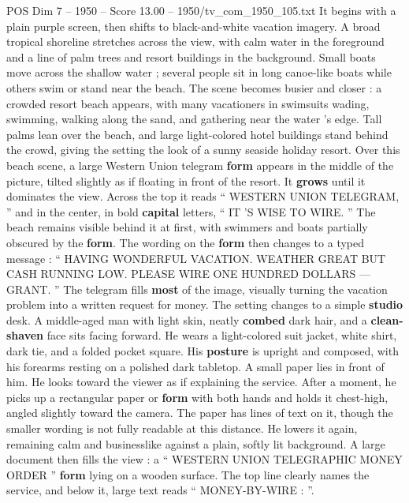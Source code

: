 \begin{textsample}{POS Dim 7 – 1950 – Score 13.00 – 1950/tv\_com\_1950\_105.txt}  \label{ex:f7_pos_018}
It begins with a plain purple screen, then shifts to black-and-white vacation imagery.
A broad tropical shoreline stretches across the view, with calm water in the foreground and a line of palm trees and resort buildings in the background.
Small boats move across the shallow water ; several people sit in long canoe-like boats while others swim or stand near the beach.
The scene becomes busier and closer : a crowded resort beach appears, with many vacationers in swimsuits wading, swimming, walking along the sand, and gathering near the water ’s edge.
Tall palms lean over the beach, and large light-colored hotel buildings stand behind the crowd, giving the setting the look of a sunny seaside holiday resort.
Over this beach scene, a large Western Union telegram \textbf{form} appears in the middle of the picture, tilted slightly as if floating in front of the resort.
It \textbf{grows} until it dominates the view.
Across the top it reads “ WESTERN UNION TELEGRAM, ” and in the center, in bold \textbf{capital} letters, “ IT ’S WISE TO WIRE. ” The beach remains visible behind it at first, with swimmers and boats partially obscured by the \textbf{form}.
The wording on the \textbf{form} then changes to a typed message : “ HAVING WONDERFUL VACATION.
WEATHER GREAT BUT CASH RUNNING LOW.
PLEASE WIRE ONE HUNDRED DOLLARS — GRANT. ” The telegram fills \textbf{most} of the image, visually turning the vacation problem into a written request for money.
The setting changes to a simple \textbf{studio} desk.
A middle-aged man with light skin, neatly \textbf{combed} dark hair, and a \textbf{clean-shaven} face sits facing forward.
He wears a light-colored suit jacket, white shirt, dark tie, and a folded pocket square.
His \textbf{posture} is upright and composed, with his forearms resting on a polished dark tabletop.
A small paper lies in front of him.
He looks toward the viewer as if explaining the service.
After a moment, he picks up a rectangular paper or \textbf{form} with both hands and holds it chest-high, angled slightly toward the camera.
The paper has lines of text on it, though the smaller wording is not fully readable at this distance.
He lowers it again, remaining calm and businesslike against a plain, softly lit background.
A large document then fills the view : a “ WESTERN UNION TELEGRAPHIC MONEY ORDER ” \textbf{form} lying on a wooden surface.
The top line clearly names the service, and below it, large text reads “ MONEY-BY-WIRE : ”.

\end{textsample}
